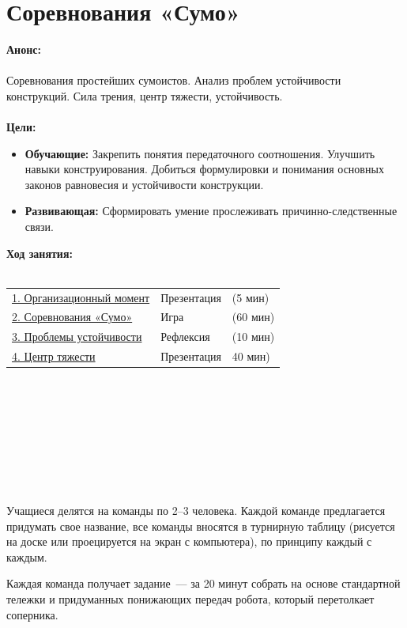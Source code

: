 \chapter{Соревнования  «Сумо»}
{\bfseries Анонс:}\\\\
Соревнования простейших сумоистов. Анализ проблем устойчивости конструкций. Сила трения, центр тяжести, устойчивость.\\\\
{\bfseries Цели:}
\begin{itemize}
	\item{}{\bfseries Обучающие:} Закрепить понятия передаточного соотношения. Улучшить навыки конструирования. Добиться формулировки и понимания основных законов равновесия и устойчивости конструкции.
	\item{}{\bfseries Развивающая:} Сформировать умение прослеживать причинно-следственные связи.\\
\end{itemize}	
{\bfseries Ход занятия:}\\\\
\begin{tabular}{lll}
	\hyperlink{lesson8x1}{1. Организационный момент} & Презентация & (5 мин)\\
	\hyperlink{lesson8x2}{2. Соревнования  «Сумо»} & Игра & (60 мин) \\
	\hyperlink{lesson8x3}{3. Проблемы устойчивости} & Рефлексия & (10 мин) \\
	\hyperlink{lesson8x4}{4. Центр тяжести} & Презентация & 40 мин)\\
\end{tabular}\\\\

{\hypertarget{lesson8x1}{}}\\\\
\\\\

{\hypertarget{lesson8x2}{}}\\\\

Учащиеся делятся на команды по 2--3 человека. Каждой команде предлагается придумать свое название, все команды вносятся в турнирную таблицу (рисуется на доске или проецируется на экран с компьютера), по принципу каждый с каждым.

Каждая команда получает задание~--- за 20 минут собрать на основе стандартной тележки и придуманных понижающих передач робота, который перетолкает соперника.\\\\

